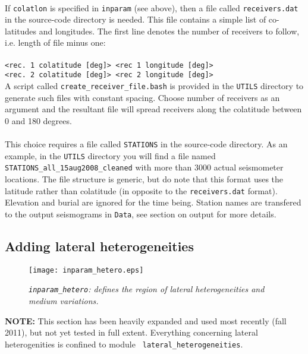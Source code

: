 \documentclass[11pt,letter,fleqn,english,notitlepage]{article}
\begin{document}
\\
If {\tt colatlon} is specified in {\tt inparam} (see above), then a file called {\tt receivers.dat} in the source-code directory 
is needed. This file contains a simple list of co-latitudes and longitudes. 
The first line denotes the number of receivers to follow, i.e. length of file minus one:\\
{\tt <number of receivers>\\
<rec. 1 colatitude [deg]> <rec 1 longitude [deg]>\\
<rec. 2 colatitude [deg]> <rec 2 longitude [deg]>}\\

\noindent 
A script called {\tt create\_receiver\_file.bash} is provided in the {\tt UTILS} directory to generate such files with constant 
spacing. Choose number of receivers as an argument and the resultant file will spread receivers along the colatitude between 0 and 
180 degrees.\\

\\
This choice requires a file called {\tt STATIONS} in the source-code directory. As an example,
in the {\tt UTILS} directory you will find a file named {\tt STATIONS\_all\_15aug2008\_cleaned} 
with more than 3000 actual seismometer locations.
The file structure is generic, but do note that this format uses the latitude rather than colatitude 
(in opposite to the {\tt receivers.dat} format). 
Elevation and burial are ignored for the time being. Station names are transfered to the 
output seismograms in {\tt Data}, see section on output for more details.

\subsection{Adding lateral heterogeneities}
\begin{figure*}[htb]
\begin{center}
\texttt{[image: inparam\_hetero.eps]}
\caption{\textit{{\tt inparam\_hetero}: defines the region of lateral heterogeneities and medium variations.}}
\end{center}
\end{figure*}
\noindent 
\textbf{NOTE:} This section has been heavily expanded and used most
recently (fall 2011), but not yet tested in full extent. Everything
concerning lateral heterogenities is confined to module {\tt
  lateral\_heterogeneities}.\\
\end{document}

